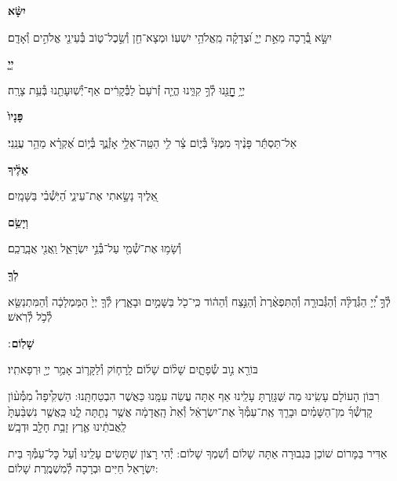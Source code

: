 \documentclass[twoside, openany, parskip=half, 11pt]{book}
\begin{document}
\textbf{יִשָּׂ֨א}
\hfill \begin{footnotesize}
יִשָּׂ֣א בְ֭֯רָכָה מֵאֵ֣ת יְיָ֑ וּ֝צְדָקָ֗ה מֵֽאֱלֹהֵ֥י יִשְׁעֽוֹ׃ וּמְצָא־חֵ֖ן וְ֯שֵׂ֣כֶל־ט֑וֹב בְּ֯עֵינֵ֖י אֱלֹהִ֣ים וְ֯אָדָֽם׃\\
\end{footnotesize}
\textbf{יְיָ֤}
\hfill \begin{footnotesize}
יְיָ֥ חׇׇׇׇׇׇׇׇנֵּ֖נוּ לְ֯ךָ֣ קִוִּ֑ינוּ הֱיֵ֤ה זְ֯רֹעָם֙ לַבְּ֯קָרִ֔ים אַף־יְ֯שֽׁוּעָתֵ֖נוּ בְּ֯עֵ֥ת צָרָֽה׃\\
\end{footnotesize}
\textbf{פָּנָיו֙}
\hfill \begin{footnotesize}
אַל־תַּסְתֵּ֬ר פָּנֶ֨יךָ מִמֶּנִּי֘ בְּ֯י֢וֹם צַ֫ר לִ֥י הַטֵּֽה־אֵלַ֥י אָזְ֯נֶ֑ךָ
בְּ֯י֥וֹם אֶ֝קְרָ֗א מַהֵ֥ר עֲנֵֽנִי׃\\
\end{footnotesize}
\textbf{אֵלֶ֔יךָ}
\hfill \begin{footnotesize}
אֵ֭לֶיךָ נָשָׂ֣אתִי אֶת־עֵינַ֑י הַ֝יֹּֽשְׁ֯בִ֗י בַּשָּׁמָֽיִם׃\\
\end{footnotesize}
\textbf{וְיָשֵׂ֥ם}
\hfill \begin{footnotesize}
וְ֯שָׂמ֥וּ אֶת־שְׁ֯מִ֖י עַל־בְּ֯נֵ֣י יִשְׂרָאֵ֑ל וַֽאֲנִ֖י אֲבָֽרֲכֵֽם׃\\
\end{footnotesize}
\textbf{לְךָ֖}
\hfill \begin{footnotesize}
לְ֯ךָ֣ יְ֠יָ הַגְּ֯דֻלָּ֨ה וְ֯הַגְּ֯בוּרָ֤ה וְ֯הַתִּפְאֶ֨רֶת֙ וְ֯הַנֵּ֣צַח וְ֯הַה֔וֹד
כִּֽי־כֹ֖ל בַּשָּׁמַ֣יִם וּבָאָ֑רֶץ לְ֯ךָ֤ יְיָ֙ הַמַּמְלָכָ֔ה וְ֯הַמִּתְנַשֵּׂ֖א
לְ֯כֹ֥ל לְ֯רֹֽאשׁ׃\\
\end{footnotesize}
\textbf{שָׁלֽוֹם}
׃ \hfill \begin{footnotesize}
בּוֹרֵ֖א נִ֣וב שְׂ֯פָתָ֑יִם שָׁל֨וֹם שָׁל֜וֹם לָֽרָח֧וֹק וְ֯לַקָּר֛וֹב
אָמַ֥ר יְיָ֖ וּרְפָאתִֽיו׃
\end{footnotesize}

\clearpage

\begin{paracol}{2}
רִבּוֹן הָעוֹלָם עָשִֽׂינוּ מַה שֶּׁגָּזַֽרְתָּ עָלֵֽינוּ אַף אַתָּה עֲשֵׂה עִמָּֽנוּ כַּאֲשֶׁר הִבְטַחְתָּֽנוּ: הַשְׁקִ֩יפָה֩ מִמְּ֯ע֨וֹן קׇדְשְׁ֯ךָ֜ מִן־הַשָּׁמַ֗יִם וּבָרֵ֤ךְ אֶֽת־עַמְּ֯ךָ֙ אֶת־יִשְׂרָאֵ֔ל וְ֯אֵת֙ הָֽאֲדָמָ֔ה אֲשֶׁ֥ר נָתַ֖תָּה לָ֑נוּ כַּֽאֲשֶׁ֤ר נִשְׁבַּ֨עְתָּ֙ לַֽאֲבֹתֵ֔ינוּ אֶ֛רֶץ זָבַ֥ת חָלָ֖ב וּדְבָֽשׁ׃

\switchcolumn

\kahal
אַדִּיר בַּמָּרוֹם שׁוֹכֵן בִּגְבוּרָה אַתָּה שָׁלוֹם וְ֯שִׁמְךָ שָׁלוֹם: יְ֯הִי רָצוֹן שֶׁתָּשִׂים עָלֵֽינוּ וְ֯עַל כׇּל־עַמְּ֯ךָ בֵּית יִשְׂרָאֵל חַיִּים וּבְרָכָה לְ֯מִשְׁמֶֽרֶת שָׁלוֹם:
\end{paracol}
\end{document}
